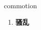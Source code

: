 
\begin{frame}
{\huge commotion}
\begin{center}
\begin{enumerate}\Large
  \item \textbf{骚乱}
\end{enumerate}
\end{center}
\end{frame}
